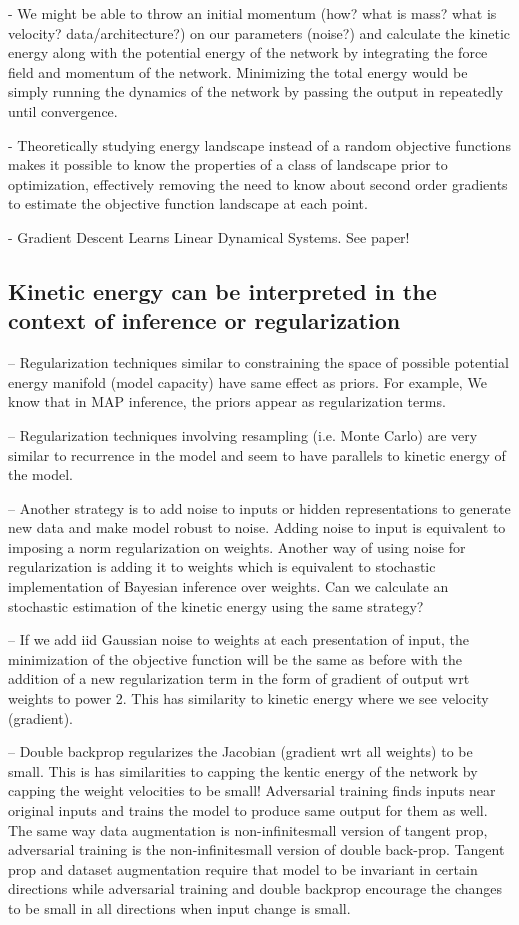 \documentclass[aps,preprint,showpacs,superscriptaddress,groupedaddress]{revtex4}  %
\begin{document}
- We might be able to throw an initial momentum (how? what is mass? what is velocity? data/architecture?) on our parameters (noise?) and calculate the kinetic energy along with the potential energy of the network by integrating the force field and momentum of the network. Minimizing the total energy would be simply running the dynamics of the network by passing the output in repeatedly until convergence. 

- Theoretically studying energy landscape instead of a random objective functions makes it possible to know the properties of a class of landscape prior to optimization, effectively removing the need to know about second order gradients to estimate the objective function landscape at each point. 

- Gradient Descent Learns Linear Dynamical Systems. See paper!

\subsection{Kinetic energy can be interpreted in the context of inference or regularization}
-- Regularization techniques similar to constraining the space of possible potential energy manifold (model capacity) have same effect as priors. For example, We know that in MAP inference, the priors appear as regularization terms. 

-- Regularization techniques involving resampling (i.e. Monte Carlo) are very similar to recurrence in the model and seem to have parallels to kinetic energy of the model.

-- Another strategy is to add noise to inputs or hidden representations to generate new data and make model robust to noise. Adding noise to input is equivalent to imposing a norm regularization on weights. Another way of using noise for regularization is adding it to weights which is equivalent to stochastic implementation of Bayesian inference over weights. Can we calculate an stochastic estimation of the kinetic energy using the same strategy?

-- If we add iid Gaussian noise to weights at each presentation of input, the minimization of the objective function will be the same as before with the addition of a new regularization term in the form of gradient of output wrt weights to power 2. This has similarity to kinetic energy where we see velocity (gradient).

-- Double backprop regularizes the Jacobian (gradient wrt all weights) to be small. This is has similarities to capping the kentic energy of the network by capping the weight velocities to be small! Adversarial training finds inputs near original inputs and trains the model to produce same output for them as well. The same way data augmentation is non-infinitesmall version of tangent prop, adversarial training is the non-infinitesmall version of double back-prop. Tangent prop and dataset augmentation require that model to be invariant in certain directions while adversarial training and double backprop encourage the changes to be small in all directions when input change is small. 
\end{document}
